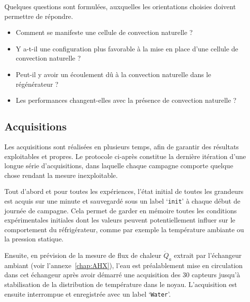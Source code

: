 Quelques questions sont formulées, auxquelles les orientations choisies doivent permettre de répondre. 

\begin{itemize}
\item Comment se manifeste une cellule de convection naturelle ?
\item Y a-t-il une configuration plus favorable à la mise en place d'une cellule de convection naturelle ?
\item Peut-il y avoir un écoulement dû à la convection naturelle dans le régénérateur ?
\item Les performances changent-elles avec la présence de convection naturelle ?
\end{itemize}


\subsection{Acquisitions}
 Les acquisitions sont réalisées en plusieurs temps, afin de garantir des résultats exploitables et propres. Le protocole ci-après constitue la dernière itération d'une longue série d'acquisitions, dans laquelle chaque campagne comporte quelque chose rendant la mesure inexploitable.

Tout d'abord et pour toutes les expériences,  l'état initial de toutes les grandeurs est acquis sur une minute et sauvegardé sous un label `\texttt{init}' à chaque début de journée de campagne. Cela permet de garder en mémoire toutes les conditions expérimentales initiales dont les valeurs peuvent potentiellement influer sur le comportement du réfrigérateur, comme par exemple la température ambiante ou la pression statique. \smallskip

Ensuite, en prévision de la mesure de flux de chaleur $\dot Q_a$ extrait par l'échangeur ambiant (voir l'annexe~\ref{chap:AHX}), l'eau est préalablement mise en circulation dans cet échangeur après avoir démarré une acquisition des 30 capteurs jusqu'à stabilisation de la distribution de température dans le noyau. L'acquisition est ensuite interrompue et enregistrée avec un label `\texttt{Water}'. \medskip

